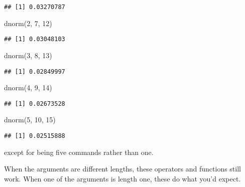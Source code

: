\documentclass[
]{article}
\newenvironment{Shaded}{\begin{snugshade}}{\end{snugshade}}
\newcommand{\DecValTok}[1]{\textcolor[rgb]{0.00,0.00,0.81}{#1}}
\newcommand{\FunctionTok}[1]{\textcolor[rgb]{0.00,0.00,0.00}{#1}}
\newcommand{\NormalTok}[1]{#1}
\begin{document}
\begin{verbatim}
## [1] 0.03270787
\end{verbatim}

\begin{Shaded}
\begin{Highlighting}[]
\FunctionTok{dnorm}\NormalTok{(}\DecValTok{2}\NormalTok{, }\DecValTok{7}\NormalTok{, }\DecValTok{12}\NormalTok{)}
\end{Highlighting}
\end{Shaded}

\begin{verbatim}
## [1] 0.03048103
\end{verbatim}

\begin{Shaded}
\begin{Highlighting}[]
\FunctionTok{dnorm}\NormalTok{(}\DecValTok{3}\NormalTok{, }\DecValTok{8}\NormalTok{, }\DecValTok{13}\NormalTok{)}
\end{Highlighting}
\end{Shaded}

\begin{verbatim}
## [1] 0.02849997
\end{verbatim}

\begin{Shaded}
\begin{Highlighting}[]
\FunctionTok{dnorm}\NormalTok{(}\DecValTok{4}\NormalTok{, }\DecValTok{9}\NormalTok{, }\DecValTok{14}\NormalTok{)}
\end{Highlighting}
\end{Shaded}

\begin{verbatim}
## [1] 0.02673528
\end{verbatim}

\begin{Shaded}
\begin{Highlighting}[]
\FunctionTok{dnorm}\NormalTok{(}\DecValTok{5}\NormalTok{, }\DecValTok{10}\NormalTok{, }\DecValTok{15}\NormalTok{)}
\end{Highlighting}
\end{Shaded}

\begin{verbatim}
## [1] 0.02515888
\end{verbatim}

except for being five commands rather than one.

When the arguments are different lengths, these operators and functions
still work. When one of the arguments is length one, these do what you'd
expect.
\end{document}
